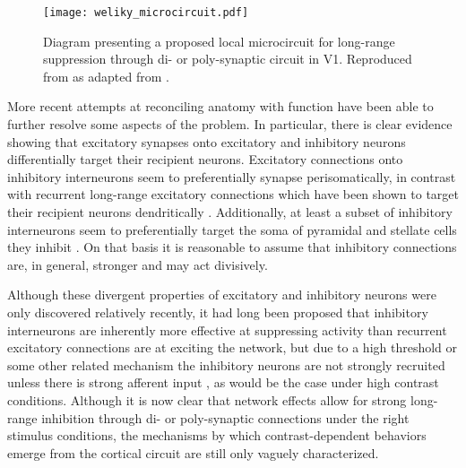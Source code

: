 \begin{figure}
	\centering
        \texttt{[image: weliky\_microcircuit.pdf]}
	\caption{Diagram presenting a proposed local microcircuit for
      long-range suppression through di- or poly-synaptic circuit in
      V1. Reproduced from \cite{Miikkulainen2005b} as adapted from
      \cite{Weliky1995}.}
	\label{V1MicroCircuit}
\end{figure}

More recent attempts at reconciling anatomy with function have been
able to further resolve some aspects of the problem. In particular, there is
clear evidence showing that excitatory synapses onto excitatory and
inhibitory neurons differentially target their recipient
neurons. Excitatory connections onto inhibitory interneurons seem to
preferentially synapse perisomatically, in contrast with recurrent
long-range excitatory connections which have been shown to target
their recipient neurons dendritically
\citep{Gilbert1990,McGuire1991}. Additionally, at least a subset of
inhibitory interneurons seem to preferentially target the soma of
pyramidal and stellate cells they inhibit \citep{Markram2004}. On that
basis it is reasonable to assume that inhibitory connections are, in
general, stronger and may act divisively.

Although these divergent properties of excitatory and inhibitory
neurons were only discovered relatively recently, it had long been proposed that
inhibitory interneurons are inherently more effective at suppressing
activity than recurrent excitatory connections are at exciting the
network, but due to a high threshold or some other related mechanism
the inhibitory neurons are not strongly recruited unless there is
strong afferent input \citep{Sillito1979}, as would be the case under
high contrast conditions. Although it is now clear that network
effects allow for strong long-range inhibition through di- or
poly-synaptic connections under the right stimulus conditions, the
mechanisms by which contrast-dependent behaviors emerge from the
cortical circuit are still only vaguely characterized.

